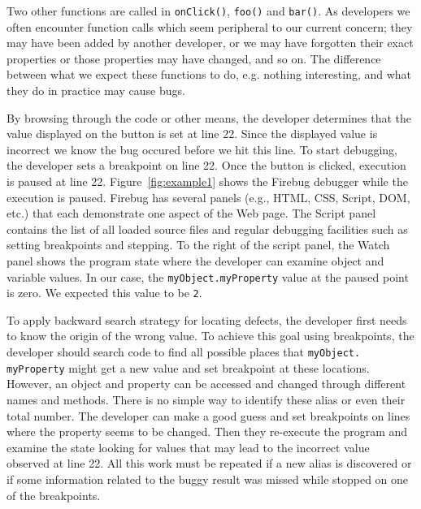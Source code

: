 \documentclass[runningheads,a4paper]{llncs}
\begin{document}
Two other functions are called in \texttt{onClick()}, \texttt{foo()}
and \texttt{bar()}. As developers we often encounter function calls
which seem peripheral to our current concern; they may have been added
by another developer, or we may have forgotten their exact properties
or those properties may have changed, and so on. The difference
between what we expect these functions to do, e.g. nothing
interesting, and what they do in practice may cause bugs.


By browsing through the code or other means\cite{Barton},
 the developer determines that the value displayed on the 
button is set at line 22. Since the displayed value is incorrect we know 
the bug occured before we hit this line.
To start debugging, the developer sets a breakpoint
on line 22. Once the button is clicked, execution is paused at line
22. Figure~\ref{fig:example1} shows the Firebug debugger while the
execution is paused. Firebug has several panels (e.g., HTML, CSS,
Script, DOM, etc.) that each demonstrate one aspect of the Web page.
The Script panel contains the list of all loaded source
files and regular debugging facilities such as setting breakpoints and
stepping. To the right of the script panel, the Watch panel shows the program state
where the developer can examine object and variable values. In our case, the
\texttt{myObject.myProperty} value at the paused point is zero. We expected this value to be \texttt{2}.

To apply backward search strategy for locating defects, the developer
first needs to know the origin of the wrong value. To achieve this
goal using breakpoints, the developer should search code to find all possible places that
\texttt{myObject. myProperty} might get a new value and set breakpoint at these locations. However, an
object and property can be accessed and changed through different
names and methods. There is no simple way to identify these alias or
even their total number.  The developer can make a good guess and set
breakpoints on lines where the property seems to be changed. Then they
re-execute the program and examine the state looking for values that
may lead to the incorrect value observed at line 22. All this work
must be repeated if a new alias is discovered or if some
information related to the buggy result was missed while stopped on
one of the breakpoints.
\end{document}
